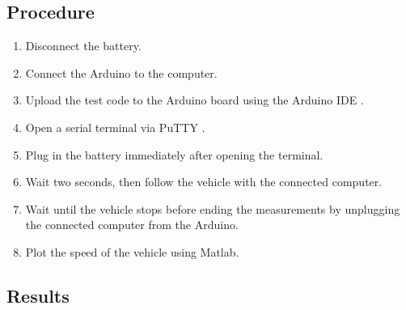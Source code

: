 \subsection{Procedure}

\begin{enumerate}
  \item Disconnect the battery.
  \item Connect the Arduino to the computer.
  \item Upload the test code to the Arduino board using the Arduino IDE \cite{ArduinoIDE}.
  \item Open a serial terminal via PuTTY \cite{PuTTY}.
  \item Plug in the battery immediately after opening the terminal.
  \item Wait two seconds, then follow the vehicle with the connected computer.
  \item Wait until the vehicle stops before ending the measurements by unplugging the connected computer from the Arduino.
  \item Plot the speed of the vehicle using Matlab.
\end{enumerate}

\subsection{Results} \label{inertiaTestResults}

